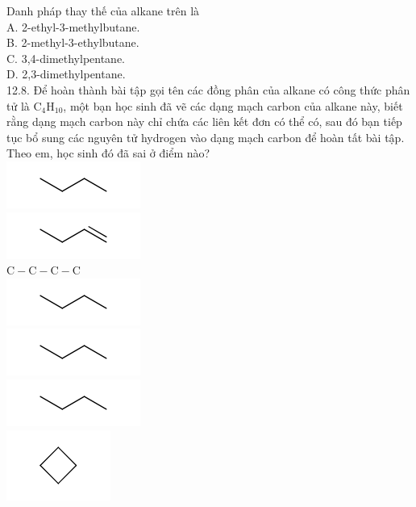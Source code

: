 \documentclass[10pt]{article}
\begin{document}
Danh pháp thay thế của alkane trên là\\
A. 2-ethyl-3-methylbutane.\\
B. 2-methyl-3-ethylbutane.\\
C. 3,4-dimethylpentane.\\
D. 2,3-dimethylpentane.\\
12.8. Để hoàn thành bài tập gọi tên các đồng phân của alkane có công thức phân tử là $\mathrm{C}_{4} \mathrm{H}_{10}$, một bạn học sinh đã vẽ các dạng mạch carbon của alkane này, biết rằng dạng mạch carbon này chỉ chứa các liên kết đơn có thể có, sau đó bạn tiếp tục bổ sung các nguyên tử hydrogen vào dạng mạch carbon để hoàn tất bài tập. Theo em, học sinh đó đã sai ở điểm nào?\\
\includegraphics{smile-0a8948220f41a445f0357c545f9ef0341be3fcdd}\\
\includegraphics{smile-dfc1b3d77ce53d5ad2ffc1294e2876ef9519f309}\\
$\mathrm{C}-\mathrm{C}-\mathrm{C}-\mathrm{C}$\\
\includegraphics{smile-dba72bb4500b12f1e1ed1e009ab619c9af46acdf}\\
\includegraphics{smile-2dc7ecf2d61c004f09b9db4df06746bffebadd05}\\
\includegraphics{smile-37652384db0dd327174a3e766e11162b936b407e}\\
\includegraphics{smile-070e996b96a6301e7bf1bddc186ada851e092f17}\\
\end{document}
